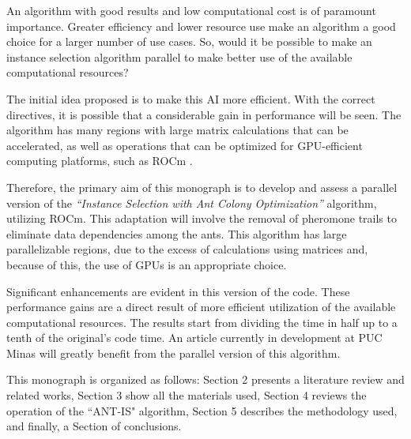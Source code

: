 An algorithm with good results and low computational cost is of paramount importance. Greater efficiency and lower resource use make an algorithm a good choice for a larger number of use cases. So, would it be possible to make an instance selection algorithm parallel to make better use of the available computational resources?

The initial idea proposed is to make this AI more efficient. With the correct directives, it is possible that a considerable gain in performance will be seen. The algorithm has many regions with large matrix calculations that can be accelerated, as well as operations that can be optimized for GPU-efficient computing platforms, such as ROCm \cite{rocm}.

Therefore, the primary aim of this monograph is to develop and assess a parallel version of the \emph{``Instance Selection with Ant Colony Optimization''} algorithm, utilizing ROCm. This adaptation will involve the removal of pheromone trails to eliminate data dependencies among the ants.
This algorithm has large parallelizable regions, due to the excess of calculations using matrices and, because of this, the use of GPUs is an appropriate choice.

Significant enhancements are evident in this version of the code. These performance gains are a direct result of more efficient utilization of the available computational resources. The results start from dividing the time in half up to a tenth of the original’s code time. An article currently in development at PUC Minas will greatly benefit from the parallel version of this algorithm.

This monograph is organized as follows: Section 2 presents a literature review and related works, Section 3 show all the materials used, Section 4 reviews the operation of the ``ANT-IS" algorithm, Section 5 describes the methodology used, and finally, a Section of conclusions.
